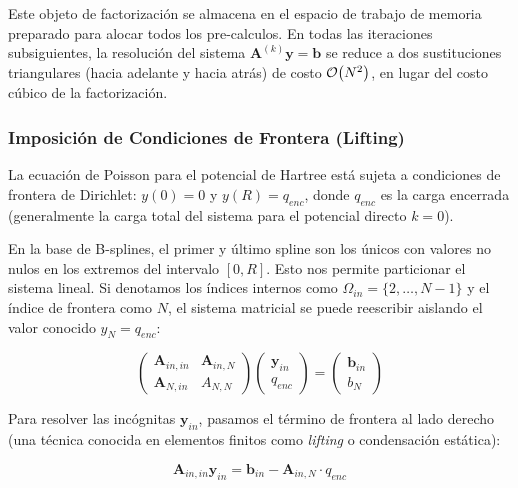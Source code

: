\documentclass[12pt, a4paper, oneside, spanish]{article}
\begin{document}
Este objeto de factorización se almacena en el espacio de trabajo de memoria preparado para alocar todos los pre-calculos. En todas las iteraciones subsiguientes, la resolución del sistema \(\mathbf{A}^{(k)}\mathbf{y} = \mathbf{b}\) se reduce a dos sustituciones triangulares (hacia adelante y hacia atrás) de costo \( \order{N^2} \), en lugar del costo cúbico de la factorización.

\subsubsection{Imposición de Condiciones de Frontera (Lifting)}

La ecuación de Poisson para el potencial de Hartree está sujeta a condiciones de frontera de Dirichlet: \( y(0) = 0 \) y \( y(R) = q_{enc} \), donde \( q_{enc} \) es la carga encerrada (generalmente la carga total del sistema para el potencial directo \( k=0 \)).

En la base de B-splines, el primer y último spline son los únicos con valores no nulos en los extremos del intervalo \( [0, R] \). Esto nos permite particionar el sistema lineal. Si denotamos los índices internos como \( \Omega_{in} = \{2, \dots, N-1\} \) y el índice de frontera como \( N \), el sistema matricial se puede reescribir aislando el valor conocido \( y_N = q_{enc} \):

\begin{equation}
\begin{pmatrix}
\mathbf{A}_{in,in} & \mathbf{A}_{in,N} \\
\mathbf{A}_{N,in} & A_{N,N}
\end{pmatrix}
\begin{pmatrix}
\mathbf{y}_{in} \\
q_{enc}
\end{pmatrix}
=
\begin{pmatrix}
\mathbf{b}_{in} \\
b_N
\end{pmatrix}
\end{equation}

Para resolver las incógnitas \( \mathbf{y}_{in} \), pasamos el término de frontera al lado derecho (una técnica conocida en elementos finitos como \textit{lifting} o condensación estática):

\begin{equation}
\mathbf{A}_{in,in} \mathbf{y}_{in} = \mathbf{b}_{in} - \mathbf{A}_{in,N} \cdot q_{enc}
\end{equation}
\end{document}
